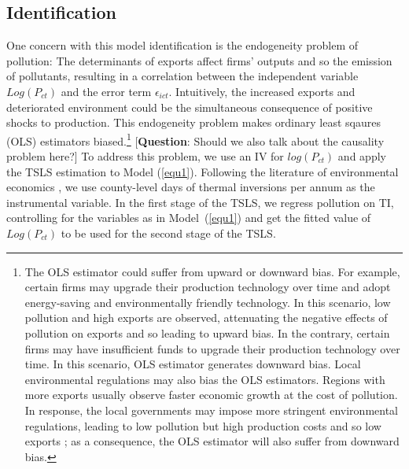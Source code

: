 \documentclass[12pt]{article}
\begin{document}
\subsection{Identification}

\label{sec:identification} 
One concern with this model identification is the endogeneity problem of
pollution: The determinants of exports affect firms' outputs and so the
emission of pollutants, resulting in a correlation between the independent
variable $Log(P_{ct})$ and the error term $\epsilon _{ict}$. Intuitively,
the increased exports and deteriorated environment could be the simultaneous
consequence of positive shocks to production. This endogeneity problem makes
ordinary least sqaures (OLS) estimators biased.\footnote{%
The OLS estimator could suffer from upward or downward bias. For example,
certain firms may upgrade their production technology over time and adopt
energy-saving and environmentally friendly technology. In this scenario, low
pollution and high exports are observed, attenuating the negative effects of
pollution on exports and so leading to upward bias. In the contrary, certain
firms may have insufficient funds to upgrade their production technology
over time. In this scenario, OLS estimator generates downward bias. Local
environmental regulations may also bias the OLS estimators. Regions with
more exports usually observe faster economic growth at the cost of
pollution. In response, the local governments may impose more stringent
environmental regulations, leading to low pollution but high production
costs and so low exports %
\citep{cherniwchan2022environmental,shi2018environmental}; as a consequence,
the OLS estimator will also suffer from downward bias.} [\textbf{Question}:
Should we also talk about the causality problem here?] To address this
problem, we use an IV for $log(P_{ct})$ and apply the TSLS estimation to
Model (\ref{equ1}). Following the literature of environmental economics %
\citep{arceo2016does,jans2018economic,sager2019estimating,fu2021air,khanna2021productivity}%
, we use county-level days of thermal inversions per annum as the
instrumental variable. In the first stage of the TSLS, we regress pollution
on TI, controlling for the variables as in Model~(\ref{equ1}) and get the
fitted value of $Log(P_{ct})$ to be used for the second stage of the TSLS.
\end{document}
